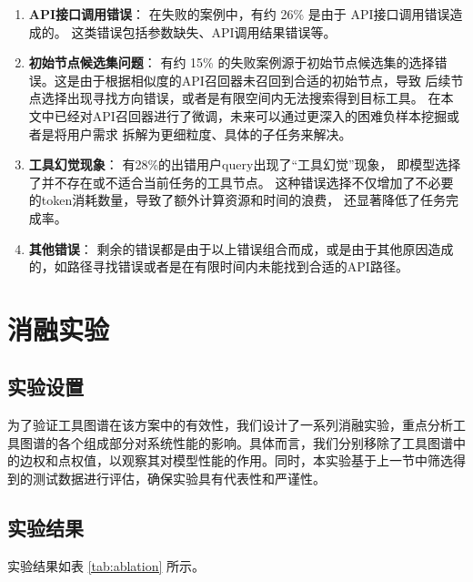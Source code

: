 \begin{enumerate}
    \item \textbf{API接口调用错误}：
    在失败的案例中，有约 26\% 是由于 API接口调用错误造成的。
    这类错误包括参数缺失、API调用结果错误等。

    \item \textbf{初始节点候选集问题}：
    有约 15\% 的失败案例源于初始节点候选集的选择错误。这是由于根据相似度的API召回器未召回到合适的初始节点，导致
    后续节点选择出现寻找方向错误，或者是有限空间内无法搜索得到目标工具。
    在本文中已经对API召回器进行了微调，未来可以通过更深入的困难负样本挖掘或者是将用户需求
    拆解为更细粒度、具体的子任务来解决。

    \item \textbf{工具幻觉现象}：
    有28\%的出错用户query出现了“工具幻觉”现象，
    即模型选择了并不存在或不适合当前任务的工具节点。
    这种错误选择不仅增加了不必要的token消耗数量，导致了额外计算资源和时间的浪费，
    还显著降低了任务完成率。

    \item \textbf{其他错误}：
    剩余的错误都是由于以上错误组合而成，或是由于其他原因造成的，如路径寻找错误或者是在有限时间内未能找到合适的API路径。

\end{enumerate}

\section{消融实验}

\subsection{实验设置}

为了验证工具图谱在该方案中的有效性，我们设计了一系列消融实验，重点分析工具图谱的各个组成部分对系统性能的影响。具体而言，我们分别移除了工具图谱中的边权和点权值，以观察其对模型性能的作用。同时，本实验基于上一节中筛选得到的测试数据进行评估，确保实验具有代表性和严谨性。

\subsection{实验结果}

实验结果如表 \ref{tab:ablation} 所示。

